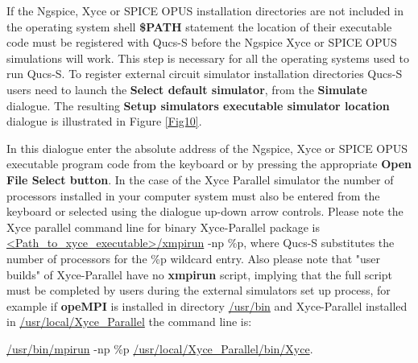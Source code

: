 \documentclass[10pt, a4paper]{report}
\begin{document}
\noindent If the Ngspice, Xyce or SPICE OPUS installation directories are not included in the operating system shell \textbf{\$PATH} statement the location of their executable code must be registered with Qucs-S before the Ngspice Xyce or SPICE OPUS simulations will work. This step is necessary for all the operating systems used to run Qucs-S.
To register external circuit simulator installation directories Qucs-S users need to launch the \textbf{Select default simulator}, from the \textbf{Simulate} dialogue. The resulting \textbf{Setup simulators executable simulator location} dialogue is illustrated in Figure \ref{Fig10}. 

In this dialogue enter the absolute address of the Ngspice, Xyce or SPICE OPUS executable program code from the keyboard or by pressing the appropriate \textbf{Open File Select button}.
In the case of the Xyce Parallel simulator the number of processors installed in your computer system must also be entered from the keyboard or selected using the dialogue up-down arrow controls. Please note the Xyce parallel command line for binary Xyce-Parallel package is  \url{<Path_to_xyce_executable>/xmpirun} -np  \%p, where Qucs-S substitutes the number of processors for the \%p wildcard entry. Also please note that "user builds" of Xyce-Parallel have no \textbf{xmpirun} script, implying that the full script must be completed by users during the external simulators set up process, for example if \textbf{opeMPI} is installed in directory \url{/usr/bin} and Xyce-Parallel installed in  \url{/usr/local/Xyce_Parallel} the command line is:
\newline

\url{/usr/bin/mpirun} -np \%p  \url{/usr/local/Xyce_Parallel/bin/Xyce}.
\newline
\end{document}
